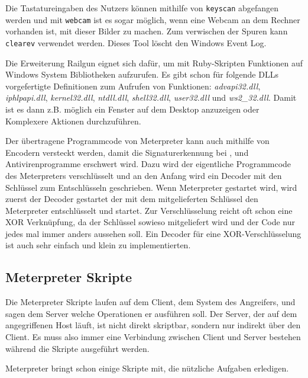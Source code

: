 Die Tastatureingaben des Nutzers können mithilfe von \texttt{keyscan}
abgefangen werden und mit \texttt{webcam} ist es sogar möglich, wenn
eine Webcam an dem Rechner vorhanden ist, mit dieser Bilder zu machen.
Zum verwischen der Spuren kann \verb!clearev! verwendet werden.
Dieses Tool löscht den Windows Event Log.

Die Erweiterung Railgun eignet sich dafür, um mit Ruby-Skripten
Funktionen auf Windows System Bibliotheken aufzurufen. Es gibt schon für
folgende DLLs vorgefertigte Definitionen zum Aufrufen von Funktionen:
\textit{advapi32.dll}, \textit{iphlpapi.dll}, \textit{kernel32.dll},
\textit{ntdll.dll}, \textit{shell32.dll}, \textit{user32.dll} und
\textit{ws2\_32.dll}. Damit ist es dann z.B. möglich ein Fenster auf dem
Desktop anzuzeigen oder Komplexere Aktionen durchzuführen.

Der übertragene Programmcode von Meterpreter kann auch mithilfe von
Encodern versteckt werden, damit die Signaturerkennung bei ,
 und Antivirenprogramme erschwert wird. Dazu wird der
eigentliche Programmcode des Meterpreters verschlüsselt und an den
Anfang wird ein Decoder mit den Schlüssel zum Entschlüsseln geschrieben.
Wenn Meterpreter gestartet wird, wird zuerst der Decoder gestartet der
mit dem mitgelieferten Schlüssel den Meterpreter entschlüsselt und
startet. Zur Verschlüsselung reicht oft schon eine XOR Verknüpfung, da
der Schlüssel sowieso mitgeliefert wird und der Code nur jedes mal immer
anders aussehen soll. Ein Decoder für eine XOR-Verschlüsselung ist auch
sehr einfach und klein zu implementierten.

\subsection{Meterpreter Skripte}
\label{compositions:meterpreter:meterpreter-skripte}

Die Meterpreter Skripte laufen auf dem Client, dem System des Angreifers,
und sagen dem Server welche Operationen er ausführen soll. Der Server,
der auf dem angegriffenen Host läuft, ist nicht direkt skriptbar, sondern
nur indirekt über den Client. Es muss also immer eine Verbindung zwischen
Client und Server bestehen während die Skripte ausgeführt werden.

Meterpreter bringt schon einige Skripte mit, die nützliche Aufgaben
erledigen.

